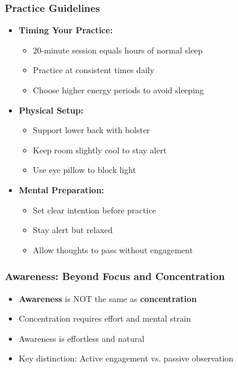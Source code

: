 \begin{frame}[fragile]\frametitle{Practice Guidelines}
    \begin{itemize}
        \item \textbf{Timing Your Practice:}
        \begin{itemize}
            \item 20-minute session equals hours of normal sleep
            \item Practice at consistent times daily
            \item Choose higher energy periods to avoid sleeping
        \end{itemize}
        \item \textbf{Physical Setup:}
        \begin{itemize}
            \item Support lower back with bolster
            \item Keep room slightly cool to stay alert
            \item Use eye pillow to block light
        \end{itemize}
        \item \textbf{Mental Preparation:}
        \begin{itemize}
            \item Set clear intention before practice
            \item Stay alert but relaxed
            \item Allow thoughts to pass without engagement
        \end{itemize}
    \end{itemize}
\end{frame}

\begin{frame}[fragile]\frametitle{Awareness: Beyond Focus and Concentration}
    \begin{itemize}
        \item \textbf{Awareness} is NOT the same as \textbf{concentration}
        \item Concentration requires effort and mental strain
        \item Awareness is effortless and natural
        \item Key distinction: Active engagement vs. passive observation
    \end{itemize}
\end{frame}

